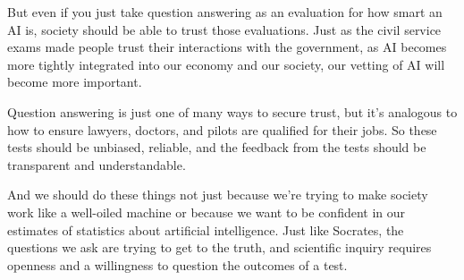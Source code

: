 But even if you just take question answering as an evaluation for how smart an AI is, society should be able to trust those evaluations.  Just as the civil service exams made people trust their interactions with the government, as AI becomes more tightly integrated into our economy and our society, our vetting of AI will become more important.

Question answering is just one of many ways to secure trust, but it’s analogous to how to ensure lawyers, doctors, and pilots are qualified for their jobs.  So these tests should be unbiased, reliable, and the feedback from the tests should be transparent and understandable.

And we should do these things not just because we’re trying to make society work like a well-oiled machine or because we want to be confident in our estimates of statistics about artificial intelligence.  Just like Socrates, the questions we ask are trying to get to the truth, and scientific inquiry requires openness and a willingness to question the outcomes of a test.

